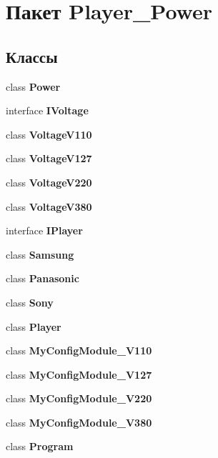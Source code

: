 \section{Пакет Player\-\_\-\-Power}
\label{namespace_player___power}
\subsection*{Классы}
\begin{DoxyCompactItemize}
\item 
class {\bf Power}
\item 
interface {\bf I\-Voltage}
\item 
class {\bfseries Voltage\-V110}
\item 
class {\bfseries Voltage\-V127}
\item 
class {\bfseries Voltage\-V220}
\item 
class {\bfseries Voltage\-V380}
\item 
interface {\bf I\-Player}
\item 
class {\bf Samsung}
\item 
class {\bf Panasonic}
\item 
class {\bf Sony}
\item 
class {\bf Player}
\item 
class {\bf My\-Config\-Module\-\_\-\-V110}
\item 
class {\bf My\-Config\-Module\-\_\-\-V127}
\item 
class {\bf My\-Config\-Module\-\_\-\-V220}
\item 
class {\bf My\-Config\-Module\-\_\-\-V380}
\item 
class {\bfseries Program}
\end{DoxyCompactItemize}
